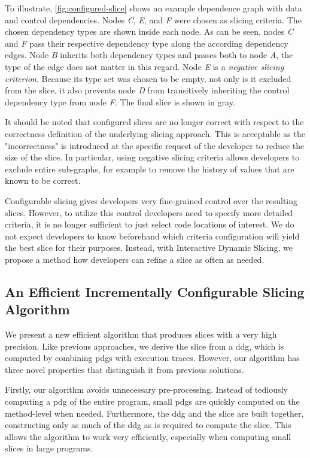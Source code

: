 To illustrate, \cref{fig:configured-slice} shows an example dependence graph with data and control dependencies.
Nodes \emph{C}, \emph{E}, and \emph{F} were chosen as slicing criteria.
The chosen dependency types are shown inside each node.
As can be seen, nodes \emph{C} and \emph{F} pass their respective dependency type along the according dependency edges.
Node \emph{B} inherits both dependency types and passes both to node \emph{A}, the type of the edge does not matter in this regard.
Node \emph{E} is a \emph{negative slicing criterion}.
Because its type set was chosen to be empty, not only is it excluded from the slice, it also prevents node \emph{D} from transitively inheriting the control dependency type from node \emph{F}.
The final slice is shown in gray.

It should be noted that configured slices are no longer correct with respect to the correctness definition of the underlying slicing approach.
This is acceptable as the "incorrectness" is introduced at the specific request of the developer to reduce the size of the slice.
In particular, using negative slicing criteria allows developers to exclude entire sub-graphs, for example to remove the history of values that are known to be correct.

Configurable slicing gives developers very fine-grained control over the resulting slices.
However, to utilize this control developers need to specify more detailed criteria, it is no longer sufficient to just select code locations of interest.
We do not expect developers to know beforehand which criteria configuration will yield the best slice for their purposes.
Instead, with Interactive Dynamic Slicing, we propose a method how developers can refine a slice as often as needed.

\tmpEnd

\subsection{An Efficient Incrementally Configurable Slicing Algorithm}

We present a new efficient algorithm that produces slices with a very high precision.
Like previous approaches, we derive the slice from a \ac{ddg}, which is computed by combining \acp{pdg} with execution traces.
However, our algorithm has three novel properties that distinguish it from previous solutions.

Firstly, our algorithm avoids unnecessary pre-processing.
Instead of tediously computing a \ac{pdg} of the entire program, small \acp{pdg} are quickly computed on the method-level when needed.
Furthermore, the \ac{ddg} and the slice are built together, constructing only as much of the \ac{ddg} as is required to compute the slice.
This allows the algorithm to work very efficiently, especially when computing small slices in large programs.

